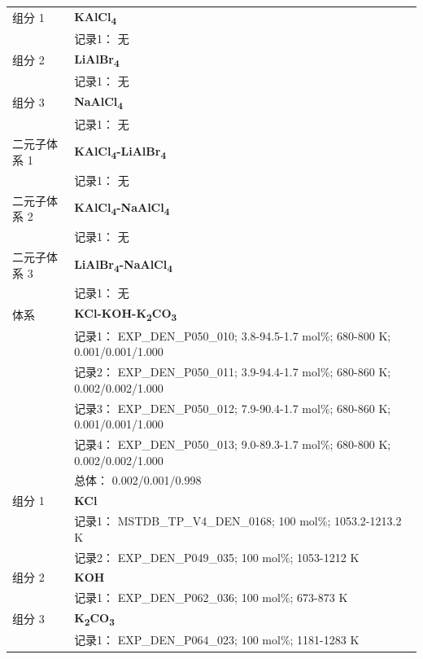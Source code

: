 \documentclass[12pt]{article}
\begin{document}
{\begin{longtable}[]{@{}
  >{\raggedright\arraybackslash}p{}
  >{\raggedright\arraybackslash}p{}@{}}
组分 1 & \textbf{KAlCl\textsubscript{4}} \\
 & 记录1： 无 \\
组分 2 & \textbf{LiAlBr\textsubscript{4}} \\
 & 记录1： 无 \\
组分 3 & \textbf{NaAlCl\textsubscript{4}} \\
 & 记录1： 无 \\
二元子体系 1 & \textbf{KAlCl\textsubscript{4}-LiAlBr\textsubscript{4}} \\
 & 记录1： 无 \\
二元子体系 2 & \textbf{KAlCl\textsubscript{4}-NaAlCl\textsubscript{4}} \\
 & 记录1： 无 \\
二元子体系 3 & \textbf{LiAlBr\textsubscript{4}-NaAlCl\textsubscript{4}} \\
 & 记录1： 无 \\
\midrule
体系 & \textbf{KCl-KOH-K\textsubscript{2}CO\textsubscript{3}} \\
 & 记录1： EXP\_DEN\_P050\_010; 3.8-94.5-1.7 mol\%; 680-800 K; 0.001/0.001/1.000 \\
 & 记录2： EXP\_DEN\_P050\_011; 3.9-94.4-1.7 mol\%; 680-860 K; 0.002/0.002/1.000 \\
 & 记录3： EXP\_DEN\_P050\_012; 7.9-90.4-1.7 mol\%; 680-860 K; 0.001/0.001/1.000 \\
 & 记录4： EXP\_DEN\_P050\_013; 9.0-89.3-1.7 mol\%; 680-800 K; 0.002/0.002/1.000 \\
 & 总体： 0.002/0.001/0.998  \\

组分 1  & \textbf{KCl} \\
 & 记录1： MSTDB\_TP\_V4\_DEN\_0168; 100 mol\%; 1053.2-1213.2 K \\
 & 记录2： EXP\_DEN\_P049\_035; 100 mol\%; 1053-1212 K  \\

组分 2  & \textbf{KOH} \\
 & 记录1： EXP\_DEN\_P062\_036; 100 mol\%; 673-873 K  \\

组分 3  & \textbf{K\textsubscript{2}CO\textsubscript{3}} \\
 & 记录1： EXP\_DEN\_P064\_023; 100 mol\%; 1181-1283 K  \\


\end{longtable}}
\end{document}
